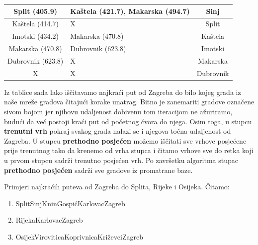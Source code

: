 \documentclass[10pt]{scrartcl}
\begin{document}
\begin{center}
\begin{table}[H]
\begin{tabularx}{1\textwidth}{c X c}
Split (405.9)          & {\color[HTML]{9B9B9B} Kaštela (421.7), Makarska (494.7)}                                & Sinj                        \\ \hline
Kaštela (414.7)        & X                                                                                       & Split                       \\ \hline
Imotski (434.2)        & Makarska (470.8)                                                                        & Kaštela                     \\ \hline
Makarska (470.8)       & Dubrovnik (623.8)                                                                       & Imotski                     \\ \hline
Dubrovnik (623.8)      & X                                                                                       & Makarska                    \\ \hline
X                      & X                                                                                       & Dubrovnik                   \\ \hline
\end{tabularx}
\end{table}
\end{center}

Iz tablice sada lako iščitavamo najkraći put od Zagreba do bilo kojeg grada iz naše mreže gradova čitajući korake unatrag. Bitno je zanemariti gradove označene sivom bojom jer njihovu udaljenost dobivenu tom iteracijom ne ažuriramo, budući da već postoji kraći put od početnog čvora do njega. Osim toga, u stupcu \textbf{trenutni vrh} pokraj svakog grada nalazi se i njegova točna udaljenost od Zagreba. U stupcu \textbf{prethodno posjećen} možemo iščitati sve vrhove posjećene prije trenutnog tako da krenemo od vrha stupca i čitamo vrhove sve do retka koji u prvom stupcu sadrži trenutno posjećen vrh. Po završetku algoritma stupac \textbf{prethodno posjećen} sadrži sve gradove iz promatrane baze.

Primjeri najkraćih puteva od Zagreba do Splita, Rijeke i Osijeka. Čitamo:
\begin{enumerate}
    \item Split\textleftarrow Sinj\textleftarrow Knin\textleftarrow Gospić\textleftarrow Karlovac\textleftarrow Zagreb
    \item Rijeka\textleftarrow Karlovac\textleftarrow Zagreb
    \item Osijek\textleftarrow Virovitica\textleftarrow Koprivnica\textleftarrow Križevci\textleftarrow Zagreb
\end{enumerate}
\end{document}
